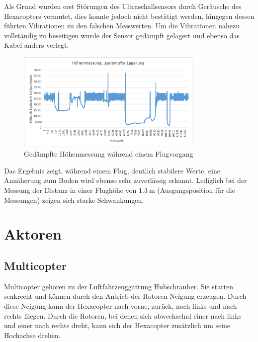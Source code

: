   Als Grund wurden erst Störungen des Ultraschallsensors durch Geräusche des Hexacopters vermutet, dies konnte jedoch nicht bestätigt werden, hingegen dessen führten Vibrationen
  zu den falschen Messwerten. Um die Vibrationen nahezu vollständig zu beseitigen wurde der Sensor gedämpft gelagert und ebenso das Kabel anders verlegt.
  \begin{figure}[H]
    \begin{centering}
      \includegraphics[width = 0.8\textwidth]{Bilder/Hoehenmessung_gedaempft}
    \par\end{centering}
    \caption{Gedämpfte Höhenmessung während einem Flugvorgang}
    \label{Hoehenmessung_gedaempft}
  \end{figure}
  Das Ergebnis zeigt, während einem Flug, deutlich stabilere Werte, eine Annäherung zum Boden wird ebenso sehr zuverlässig erkannt. Lediglich bei der Messung der Distanz in einer Flughöhe
  von \ca $\SI{1.3}{\meter}$ (Ausgangsposition für die Messungen) zeigen sich starke Schwankungen.

\chapter{Aktoren}
\renewcommand{\kapitelautor}{Autor: Christina Bornberg}

\section{Multicopter}
  Multicopter gehören zu der Luftfahrzeuggattung Hubschrauber. Sie starten senkrecht und können durch den Antrieb der Rotoren Neigung erzeugen. Durch diese Neigung kann der Hexacopter nach vorne, zurück, nach links und nach rechts fliegen. Durch die Rotoren, bei denen sich abwechselnd einer nach links und einer nach rechts dreht, kann sich der Hexacopter zusätzlich um seine Hochachse drehen.

